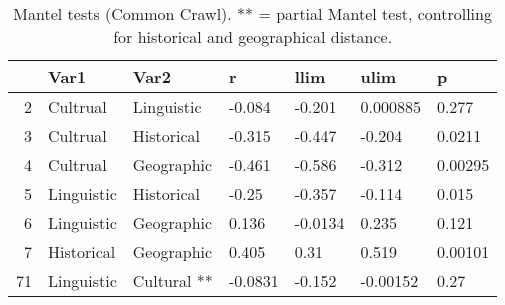 \begin{table}[ht]
\centering
\begin{tabular}{rllllll}
  \hline
 & Var1 & Var2 & r & llim & ulim & p \\ 
  \hline
2 & Cultrual & Linguistic & -0.084 & -0.201 & 0.000885 & 0.277 \\ 
  3 & Cultrual & Historical & -0.315 & -0.447 & -0.204 & 0.0211 \\ 
  4 & Cultrual & Geographic & -0.461 & -0.586 & -0.312 & 0.00295 \\ 
  5 & Linguistic & Historical & -0.25 & -0.357 & -0.114 & 0.015 \\ 
  6 & Linguistic & Geographic & 0.136 & -0.0134 & 0.235 & 0.121 \\ 
  7 & Historical & Geographic & 0.405 & 0.31 & 0.519 & 0.00101 \\ 
  71 & Linguistic & Cultural ** & -0.0831 & -0.152 & -0.00152 & 0.27 \\ 
   \hline
\end{tabular}
\caption{Mantel tests (Common Crawl). ** = partial Mantel test, controlling for historical and geographical distance.} 
\end{table}
